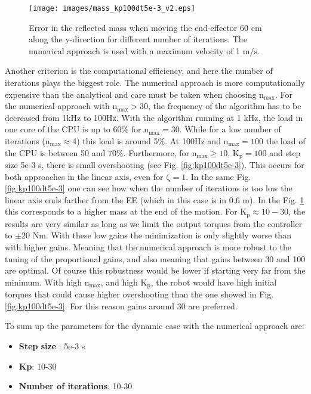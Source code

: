 \begin{figure}[!htb]
	\centerline{
		\texttt{[image: images/mass\_kp100dt5e-3\_v2.eps]}}
	\caption{Error in the reflected mass when moving the end-effector 60 cm along the y-direction for different number of iterations. The numerical approach is used with a maximum velocity of 1 $\mathrm{m/s}$.}
	\label{fig:mass_kp100dt5e-3}
\end{figure}

Another criterion is the computational efficiency, and here the number of iterations plays the biggest role. The numerical approach is more computationally expensive than the analytical and care must be taken when choosing $\mathrm{n_{max}}$.  For the numerical approach with $\mathrm{n_{max} > 30}$, the frequency of the algorithm has to be decreased from 1kHz to 100Hz.  With the algorithm running at 1 kHz, the load in one core of the CPU is up to 60\% for $\mathrm{n_{max} = 30}$. While for a low number of iterations ($\mathrm{n_{max} \approx 4} $) this load is around 5\%.  At 100Hz and $\mathrm{n_{max} = 100}$ the load of the CPU is between 50 and 70\%.  Furthermore, for  $\mathrm{n_{max} \ge 10}$,  $\mathrm{K_p=100}$ and step size 5e-3 s,  there is small overshooting (see Fig. \ref{fig:kp100dt5e-3}). This occurs for both approaches in the linear axis, even for $\mathrm{\zeta = 1}$. In the same Fig. \ref{fig:kp100dt5e-3} one can see how when the number of iterations is too low the linear axis ends farther from the EE (which in this case is in 0.6 m). In the Fig. \ref{fig:mass_kp100dt5e-3} this corresponds to a higher mass at the end of the motion. 
For $\mathrm{K_p} \approx 10 - 30$, the results are very similar as long as we limit the output torques from the controller to $\pm$20 Nm. With these low gains the minimization is only slightly worse than with higher gains. Meaning that the numerical approach is more robust to the tuning of the proportional gains, and also meaning that gains between 30 and 100 are optimal.
Of course this robustness would be lower if starting very far from the minimum. With  high $\mathrm{n_{max}}$, and high $\mathrm{K_p}$, the robot would have high initial torques that could cause higher overshooting than the one showed in Fig. \ref{fig:kp100dt5e-3}. For this reason gains around 30 are preferred. 

To sum up the parameters for the dynamic case with the numerical approach are:
 \begin{itemize}  
 	\item \textbf{Step size} : 5e-3 s
 	\item \textbf{Kp}: 10-30
    \item \textbf{Number of iterations}: 10-30
  \end{itemize} 
 
